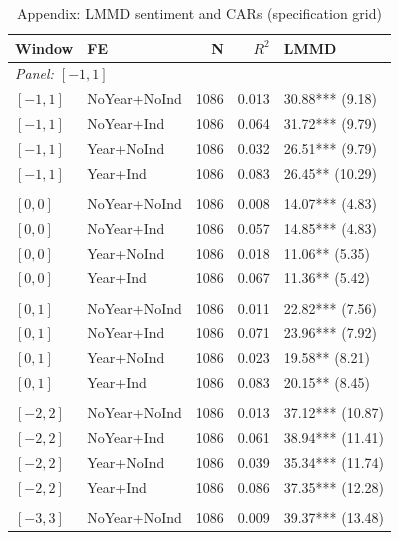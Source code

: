 \begin{table}[p]
\centering
\caption{Appendix: LMMD sentiment and CARs (specification grid)}
\label{tab:app_lmmd_only}
\scriptsize
\setlength{\tabcolsep}{4pt}
\renewcommand{\arraystretch}{1.1}
\begin{tabular}{l l r r l}
\toprule
Window & FE & N & $R^{2}$ & LMMD \\
\midrule
\multicolumn{5}{l}{\textit{Panel: $[-1,1]$}} \\
\addlinespace[1pt]
$[-1,1]$ & NoYear+NoInd & 1086 & 0.013 & 30.88*** (9.18) \\
$[-1,1]$ & NoYear+Ind & 1086 & 0.064 & 31.72*** (9.79) \\
$[-1,1]$ & Year+NoInd & 1086 & 0.032 & 26.51*** (9.79) \\
$[-1,1]$ & Year+Ind & 1086 & 0.083 & 26.45** (10.29) \\
\addlinespace[2pt]
\multicolumn{5}{l}{\textit{Panel: $[0,0]$}} \\
\addlinespace[1pt]
$[0,0]$ & NoYear+NoInd & 1086 & 0.008 & 14.07*** (4.83) \\
$[0,0]$ & NoYear+Ind & 1086 & 0.057 & 14.85*** (4.83) \\
$[0,0]$ & Year+NoInd & 1086 & 0.018 & 11.06** (5.35) \\
$[0,0]$ & Year+Ind & 1086 & 0.067 & 11.36** (5.42) \\
\addlinespace[2pt]
\multicolumn{5}{l}{\textit{Panel: $[0,1]$}} \\
\addlinespace[1pt]
$[0,1]$ & NoYear+NoInd & 1086 & 0.011 & 22.82*** (7.56) \\
$[0,1]$ & NoYear+Ind & 1086 & 0.071 & 23.96*** (7.92) \\
$[0,1]$ & Year+NoInd & 1086 & 0.023 & 19.58** (8.21) \\
$[0,1]$ & Year+Ind & 1086 & 0.083 & 20.15** (8.45) \\
\addlinespace[2pt]
\multicolumn{5}{l}{\textit{Panel: $[-2,2]$}} \\
\addlinespace[1pt]
$[-2,2]$ & NoYear+NoInd & 1086 & 0.013 & 37.12*** (10.87) \\
$[-2,2]$ & NoYear+Ind & 1086 & 0.061 & 38.94*** (11.41) \\
$[-2,2]$ & Year+NoInd & 1086 & 0.039 & 35.34*** (11.74) \\
$[-2,2]$ & Year+Ind & 1086 & 0.086 & 37.35*** (12.28) \\
\addlinespace[2pt]
\multicolumn{5}{l}{\textit{Panel: $[-3,3]$}} \\
\addlinespace[1pt]
$[-3,3]$ & NoYear+NoInd & 1086 & 0.009 & 39.37*** (13.48) \\

\end{tabular}
\end{table}
